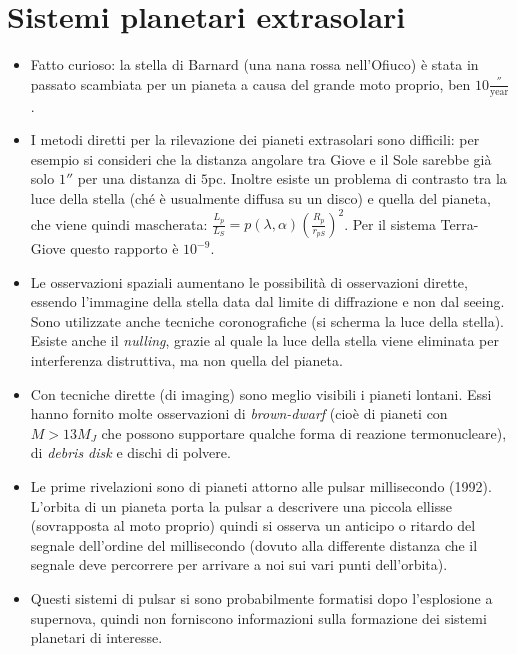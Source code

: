 \documentclass[11pt,a4paper]{article}
\begin{document}
\section{Sistemi planetari extrasolari}
\begin{itemize}
\item Fatto curioso: la stella di Barnard (una nana rossa nell'Ofiuco) è stata in passato scambiata per un pianeta a causa del grande moto proprio, ben $10 \frac{''}{\text{year}}$.

\item I metodi diretti per la rilevazione dei pianeti extrasolari sono difficili: per esempio si consideri che la distanza angolare tra Giove e il Sole sarebbe già solo $1''$ per una distanza di $5$pc. Inoltre esiste un problema di contrasto tra la luce della stella (ché è usualmente diffusa su un disco) e quella del pianeta, che viene quindi mascherata: $\frac{L_{p}}{L_S} = p(\lambda, \alpha) \left( \frac{R_p}{r_{pS}} \right) ^{2}$. Per il sistema Terra-Giove questo rapporto è $10^{-9}$.

\item Le osservazioni spaziali aumentano le possibilità di osservazioni dirette, essendo l'immagine della stella data dal limite di diffrazione e non dal seeing. Sono utilizzate anche tecniche coronografiche (si scherma la luce della stella). Esiste anche il \textit{nulling}, grazie al quale la luce della stella viene eliminata per interferenza distruttiva, ma non quella del pianeta.

\item Con tecniche dirette (di imaging) sono meglio visibili i pianeti lontani. Essi hanno fornito molte osservazioni di \textit{brown-dwarf} (cioè di pianeti con  $M > 13 M_{J}$ che possono supportare qualche forma di reazione termonucleare), di \textit{debris disk} e dischi di polvere.

\item Le prime rivelazioni sono di pianeti attorno alle pulsar millisecondo (1992). L'orbita di un pianeta porta la pulsar a descrivere una piccola ellisse (sovrapposta al moto proprio) quindi si osserva un anticipo o ritardo del segnale dell'ordine del millisecondo (dovuto alla differente distanza che il segnale deve percorrere per arrivare a noi sui vari  punti dell'orbita). 

\item Questi sistemi di pulsar si sono probabilmente formatisi dopo l'esplosione a supernova, quindi non forniscono informazioni sulla formazione dei sistemi planetari di interesse.


\end{itemize}
\end{document}
